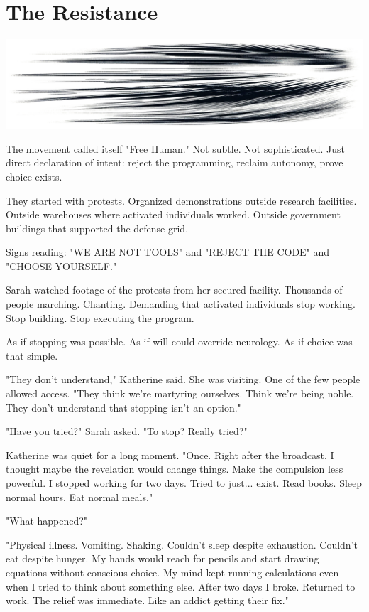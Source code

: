 \chapter{The Resistance}
\label{ch:26}



\begin{center}
\includegraphics[width=\textwidth]{images/chapterImages/genesis_sketch_00123_.png}
\end{center}

The movement called itself "Free Human." Not subtle. Not sophisticated. Just direct declaration of intent: reject the programming, reclaim autonomy, prove choice exists.

They started with protests. Organized demonstrations outside research facilities. Outside warehouses where activated individuals worked. Outside government buildings that supported the defense grid.

Signs reading: "WE ARE NOT TOOLS" and "REJECT THE CODE" and "CHOOSE YOURSELF."

Sarah watched footage of the protests from her secured facility. Thousands of people marching. Chanting. Demanding that activated individuals stop working. Stop building. Stop executing the program.

As if stopping was possible. As if will could override neurology. As if choice was that simple.

"They don't understand," Katherine said. She was visiting. One of the few people allowed access. "They think we're martyring ourselves. Think we're being noble. They don't understand that stopping isn't an option."

"Have you tried?" Sarah asked. "To stop? Really tried?"

Katherine was quiet for a long moment. "Once. Right after the broadcast. I thought maybe the revelation would change things. Make the compulsion less powerful. I stopped working for two days. Tried to just... exist. Read books. Sleep normal hours. Eat normal meals."

"What happened?"

"Physical illness. Vomiting. Shaking. Couldn't sleep despite exhaustion. Couldn't eat despite hunger. My hands would reach for pencils and start drawing equations without conscious choice. My mind kept running calculations even when I tried to think about something else. After two days I broke. Returned to work. The relief was immediate. Like an addict getting their fix."

